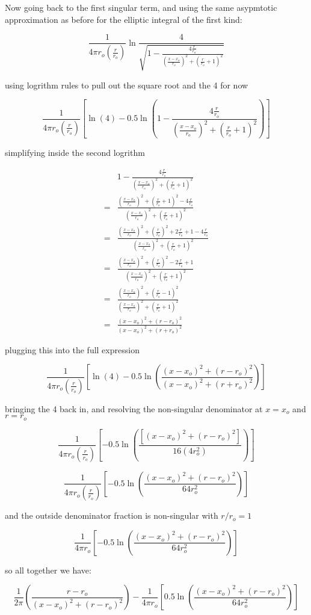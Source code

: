 Now going back to the first singular term, and using the same asypmtotic approximation as before for the elliptic integral of the first kind:

$$
\frac{1}{4\pi r_o \left(\frac{r}{r_o}\right)} \ln \frac{4}{\sqrt{1-\frac{4\frac{r}{r_o}}{\left(\frac{x-x_o}{r_o}\right)^2 + \left(\frac{r}{r_o}+1\right)^2}}}
$$

using logrithm rules to pull out the square root and the 4 for now

$$
\frac{1}{4\pi r_o\left(\frac{r}{r_o}\right)} \left[\ln(4) - 0.5 \ln\left(1-\frac{4\frac{r}{r_o}}{\left(\frac{x-x_o}{r_o}\right)^2 + \left(\frac{r}{r_o}+1\right)^2}\right)\right]
$$

simplifying inside the second logrithm

$$
\begin{aligned}
& 1-\frac{4\frac{r}{r_o}}{\left(\frac{x-x_o}{r_o}\right)^2 + \left(\frac{r}{r_o}+1\right)^2} \\
%
=& \frac{{\left(\frac{x-x_o}{r_o}\right)^2 + \left(\frac{r}{r_o}+1\right)^2}-4\frac{r}{r_o}}{\left(\frac{x-x_o}{r_o}\right)^2 + \left(\frac{r}{r_o}+1\right)^2}\\
%
=& \frac{\left(\frac{x-x_o}{r_o}\right)^2 + \left(\frac{r}{r_o}\right)^2+2\frac{r}{r_o}+1-4\frac{r}{r_o}}{\left(\frac{x-x_o}{r_o}\right)^2 + \left(\frac{r}{r_o}+1\right)^2}\\
%
=& \frac{\left(\frac{x-x_o}{r_o}\right)^2 + \left(\frac{r}{r_o}\right)^2-2\frac{r}{r_o}+1}{\left(\frac{x-x_o}{r_o}\right)^2 + \left(\frac{r}{r_o}+1\right)^2}\\
%
=& \frac{\left(\frac{x-x_o}{r_o}\right)^2 + \left(\frac{r}{r_o}-1\right)^2}{\left(\frac{x-x_o}{r_o}\right)^2 + \left(\frac{r}{r_o}+1\right)^2}\\
%
=& \frac{\left(x-x_o\right)^2 + \left(r-r_o\right)^2}{\left(x-x_o\right)^2 + \left(r+r_o\right)^2}
\end{aligned}
$$

plugging this into the full expression

$$
\frac{1}{4\pi r_o\left(\frac{r}{r_o}\right)} \left[\ln(4) - 0.5 \ln\left(\frac{\left(x-x_o\right)^2 + \left(r-r_o\right)^2}{\left(x-x_o\right)^2 + \left(r+r_o\right)^2}\right)\right]
$$

bringing the 4 back in, and resolving the non-singular denominator at $x=x_o$ and $r=r_o$

$$
\frac{1}{4\pi r_o\left(\frac{r}{r_o}\right)} \left[ - 0.5 \ln\left(\frac{\left[\left(x-x_o\right)^2 + \left(r-r_o\right)^2\right]}{16\left(4r_o^2\right)}\right)\right]
$$

$$
\frac{1}{4\pi r_o\left(\frac{r}{r_o}\right)} \left[ - 0.5 \ln\left(\frac{\left(x-x_o\right)^2 + \left(r-r_o\right)^2}{64r_o^2}\right)\right]
$$

and the outside denominator fraction is non-singular with $r/r_o = 1$

$$
\frac{1}{4\pi r_o} \left[ - 0.5 \ln\left(\frac{\left(x-x_o\right)^2 + \left(r-r_o\right)^2}{64r_o^2}\right)\right]
$$

so all together we have:

$$
\frac{1}{2\pi}
%
\left(\frac{r-r_o}{\left(x-x_o\right)^2 + \left(r-r_o\right)^2}\right)
%
-\frac{1}{4\pi r_o} \left[ 0.5 \ln\left(\frac{\left(x-x_o\right)^2 + \left(r-r_o\right)^2}{64r_o^2}\right)\right]
$$
